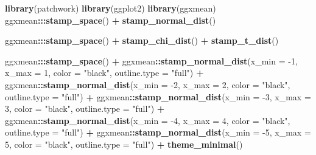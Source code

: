 \documentclass[12pt]{article}
\newenvironment{Shaded}{\begin{snugshade}}{\end{snugshade}}
\newcommand{\DataTypeTok}[1]{\textcolor[rgb]{0.13,0.29,0.53}{#1}}
\newcommand{\DecValTok}[1]{\textcolor[rgb]{0.00,0.00,0.81}{#1}}
\newcommand{\KeywordTok}[1]{\textcolor[rgb]{0.13,0.29,0.53}{\textbf{#1}}}
\newcommand{\NormalTok}[1]{#1}
\newcommand{\OperatorTok}[1]{\textcolor[rgb]{0.81,0.36,0.00}{\textbf{#1}}}
\newcommand{\StringTok}[1]{\textcolor[rgb]{0.31,0.60,0.02}{#1}}
\begin{document}
\begin{Shaded}
\begin{Highlighting}[]
\KeywordTok{library}\NormalTok{(patchwork)}
\KeywordTok{library}\NormalTok{(ggplot2)}
\KeywordTok{library}\NormalTok{(ggxmean)}
\NormalTok{ggxmean}\OperatorTok{:::}\KeywordTok{stamp_space}\NormalTok{() }\OperatorTok{+}
\StringTok{  }\KeywordTok{stamp_normal_dist}\NormalTok{()}

\NormalTok{ggxmean}\OperatorTok{:::}\KeywordTok{stamp_space}\NormalTok{() }\OperatorTok{+}
\StringTok{  }\KeywordTok{stamp_chi_dist}\NormalTok{() }\OperatorTok{+}\StringTok{ }
\StringTok{  }\KeywordTok{stamp_t_dist}\NormalTok{()}

\NormalTok{ggxmean}\OperatorTok{:::}\KeywordTok{stamp_space}\NormalTok{() }\OperatorTok{+}
\StringTok{  }\NormalTok{ggxmean}\OperatorTok{::}\KeywordTok{stamp_normal_dist}\NormalTok{(}\DataTypeTok{x_min =} \DecValTok{-1}\NormalTok{, }\DataTypeTok{x_max =} \DecValTok{1}\NormalTok{, }\DataTypeTok{color =} \StringTok{"black"}\NormalTok{, }\DataTypeTok{outline.type =} \StringTok{"full"}\NormalTok{) }\OperatorTok{+}
\StringTok{  }\NormalTok{ggxmean}\OperatorTok{::}\KeywordTok{stamp_normal_dist}\NormalTok{(}\DataTypeTok{x_min =} \DecValTok{-2}\NormalTok{, }\DataTypeTok{x_max =} \DecValTok{2}\NormalTok{, }\DataTypeTok{color =} \StringTok{"black"}\NormalTok{, }\DataTypeTok{outline.type =} \StringTok{"full"}\NormalTok{) }\OperatorTok{+}
\StringTok{  }\NormalTok{ggxmean}\OperatorTok{::}\KeywordTok{stamp_normal_dist}\NormalTok{(}\DataTypeTok{x_min =} \DecValTok{-3}\NormalTok{, }\DataTypeTok{x_max =} \DecValTok{3}\NormalTok{, }\DataTypeTok{color =} \StringTok{"black"}\NormalTok{, }\DataTypeTok{outline.type =} \StringTok{"full"}\NormalTok{) }\OperatorTok{+}
\StringTok{  }\NormalTok{ggxmean}\OperatorTok{::}\KeywordTok{stamp_normal_dist}\NormalTok{(}\DataTypeTok{x_min =} \DecValTok{-4}\NormalTok{, }\DataTypeTok{x_max =} \DecValTok{4}\NormalTok{, }\DataTypeTok{color =} \StringTok{"black"}\NormalTok{, }\DataTypeTok{outline.type =} \StringTok{"full"}\NormalTok{) }\OperatorTok{+}
\StringTok{  }\NormalTok{ggxmean}\OperatorTok{::}\KeywordTok{stamp_normal_dist}\NormalTok{(}\DataTypeTok{x_min =} \DecValTok{-5}\NormalTok{, }\DataTypeTok{x_max =} \DecValTok{5}\NormalTok{, }\DataTypeTok{color =} \StringTok{"black"}\NormalTok{, }\DataTypeTok{outline.type =} \StringTok{"full"}\NormalTok{) }\OperatorTok{+}
\StringTok{  }\KeywordTok{theme_minimal}\NormalTok{()}
\end{Highlighting}
\end{Shaded}
\end{document}
